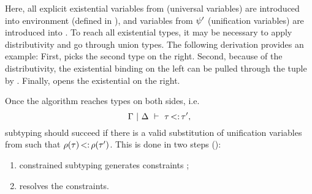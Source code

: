 Here, all explicit existential variables from \tysig (universal variables)
are introduced into environment \AEnv (defined in ), 
and variables from $\psi'$ (unification variables) are introduced into \UEnv.
To reach all existential types, it may be necessary to apply distributivity
and go through union types. The following derivation provides an example:
First,  picks the second type on the right.
Second, because of the distributivity, the existential binding on the left
can be pulled through the tuple by .
Finally,  opens the existential on the right.

Once the algorithm reaches types on both sides,
i.e. \[ \Gamma~\vert~\Delta\ \vdash\ \tau \operatorname{<:} \tau', \]
subtyping should succeed if there is 
a valid substitution \substvars of unification variables from \UEnv
such that $\rho(\tau) \operatorname{<:} \rho(\tau')$.
This is done in two steps ():
\begin{enumerate}
    \item constrained subtyping 
      generates constraints \CSet;
    \item \solvectrdflt resolves the constraints.
\end{enumerate}

